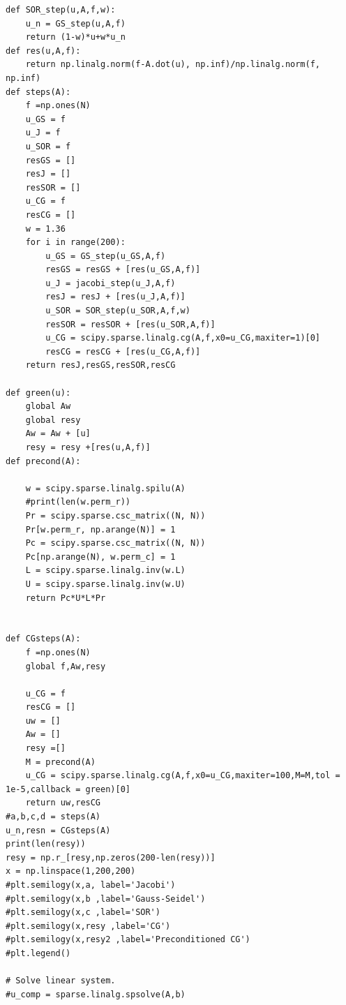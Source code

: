 \documentclass[letterpaper,12pt]{article}
\begin{document}
\begin{enumerate}
\begin{lstlisting}[style=myPythonstyle]
def SOR_step(u,A,f,w):
    u_n = GS_step(u,A,f) 
    return (1-w)*u+w*u_n
def res(u,A,f):
    return np.linalg.norm(f-A.dot(u), np.inf)/np.linalg.norm(f, np.inf) 
def steps(A):
    f =np.ones(N)
    u_GS = f
    u_J = f
    u_SOR = f
    resGS = []
    resJ = []
    resSOR = []
    u_CG = f
    resCG = []
    w = 1.36
    for i in range(200):
        u_GS = GS_step(u_GS,A,f)
        resGS = resGS + [res(u_GS,A,f)]
        u_J = jacobi_step(u_J,A,f)
        resJ = resJ + [res(u_J,A,f)]
        u_SOR = SOR_step(u_SOR,A,f,w)
        resSOR = resSOR + [res(u_SOR,A,f)]
        u_CG = scipy.sparse.linalg.cg(A,f,x0=u_CG,maxiter=1)[0]
        resCG = resCG + [res(u_CG,A,f)]
    return resJ,resGS,resSOR,resCG

def green(u):
    global Aw
    global resy
    Aw = Aw + [u]
    resy = resy +[res(u,A,f)]
def precond(A):
    
    w = scipy.sparse.linalg.spilu(A)
    #print(len(w.perm_r))
    Pr = scipy.sparse.csc_matrix((N, N)) 
    Pr[w.perm_r, np.arange(N)] = 1
    Pc = scipy.sparse.csc_matrix((N, N))
    Pc[np.arange(N), w.perm_c] = 1
    L = scipy.sparse.linalg.inv(w.L)
    U = scipy.sparse.linalg.inv(w.U)
    return Pc*U*L*Pr
    
    
def CGsteps(A):
    f =np.ones(N)
    global f,Aw,resy
    
    u_CG = f
    resCG = []
    uw = []
    Aw = []
    resy =[]
    M = precond(A)
    u_CG = scipy.sparse.linalg.cg(A,f,x0=u_CG,maxiter=100,M=M,tol = 1e-5,callback = green)[0]
    return uw,resCG
#a,b,c,d = steps(A)
u_n,resn = CGsteps(A)
print(len(resy))
resy = np.r_[resy,np.zeros(200-len(resy))]
x = np.linspace(1,200,200)
#plt.semilogy(x,a, label='Jacobi')
#plt.semilogy(x,b ,label='Gauss-Seidel')
#plt.semilogy(x,c ,label='SOR')
#plt.semilogy(x,resy ,label='CG')
#plt.semilogy(x,resy2 ,label='Preconditioned CG')
#plt.legend()

# Solve linear system.
#u_comp = sparse.linalg.spsolve(A,b)
\end{lstlisting}


\end{enumerate}
\end{document}
